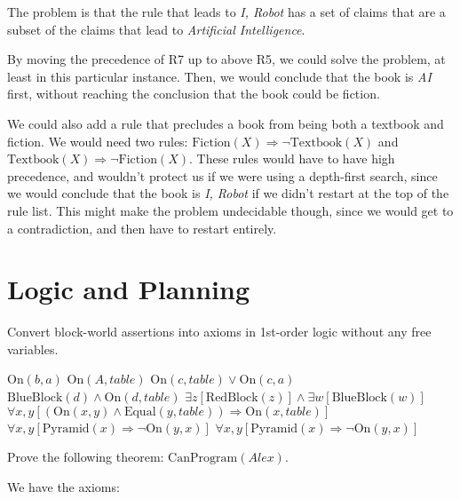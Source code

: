 \documentclass[11pt,largemargins, anonymous]{homework}
\begin{document}
The problem is that the rule that leads to \textit{I, Robot}
has a set of claims that are a subset of the claims that lead to \textit{Artificial Intelligence}.

By moving the precedence of R7 up to above R5, we could solve the problem,
at least in this particular instance.
Then, we would conclude that the book is \textit{AI} first,
without reaching the conclusion that the book could be fiction.

We could also add a rule that precludes a book from being both a textbook and fiction.
We would need two rules: $\mathrm{Fiction}(X) \Rightarrow \neg \mathrm{Textbook}(X)$ and $\mathrm{Textbook}(X) \Rightarrow \neg \mathrm{Fiction}(X)$. These rules would have to have high precedence,
and wouldn't protect us if we were using a depth-first search,
since we would conclude that the book is \textit{I, Robot} if we didn't restart at the top of the rule list.
This might make the problem undecidable though,
since we would get to a contradiction,
and then have to restart entirely.

\part{Logic and Planning}

\question

Convert block-world assertions into axioms in 1st-order logic
without any free variables.

\begin{arabicparts}

    \questionpart \( \mathrm{On}(b, a) \)
    \questionpart \( \mathrm{On}(A, table) \)
    \questionpart \( \mathrm{On}(c, table) \lor \mathrm{On}(c, a) \)
    \questionpart \( \mathrm{BlueBlock}(d) \land \mathrm{On}(d, table) \)
    \questionpart \( \exists z [\mathrm{RedBlock}(z)] \land \exists w [\mathrm{BlueBlock}(w)] \)
    \questionpart \( \forall x, y [(\mathrm{On}(x, y) \land \mathrm{Equal}(y, table)) \Rightarrow \mathrm{On}(x, table)] \)
    \questionpart \( \forall x, y [\mathrm{Pyramid}(x) \Rightarrow  \neg \mathrm{On}(y, x)] \)
    \questionpart \( \forall x, y [\mathrm{Pyramid}(x) \Rightarrow  \neg \mathrm{On}(y, x)] \)

\end{arabicparts}

\question

Prove the following theorem: \( \mathrm{CanProgram}(Alex) \).

We have the axioms:
\end{document}
